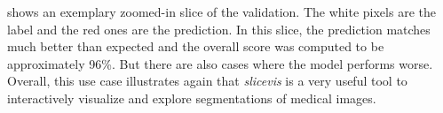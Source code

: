  shows an exemplary zoomed-in slice of the validation. The white pixels are the label and the red ones are the prediction. In this slice, the prediction matches much better than expected and the overall score was computed to be approximately 96\%. But there are also cases where the model performs worse. Overall, this use case illustrates again that \emph{slicevis} is a very useful tool to interactively visualize and explore segmentations of medical images.
